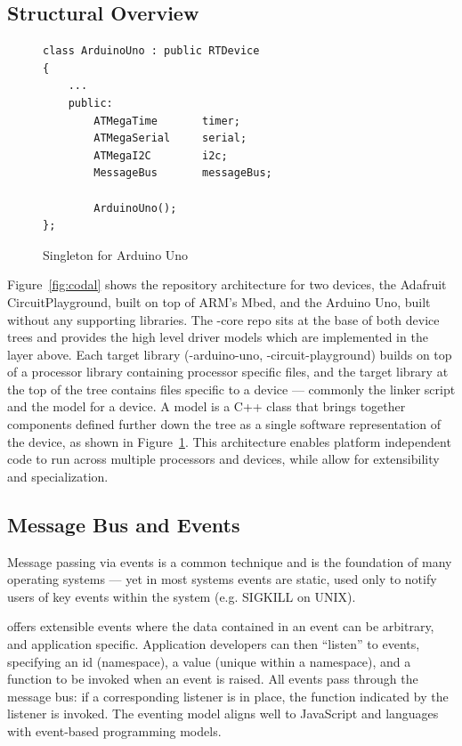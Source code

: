 \subsection{Structural Overview}

\begin{figure}
\begin{lstlisting}
class ArduinoUno : public RTDevice
{
    ...
    public:
        ATMegaTime       timer;
        ATMegaSerial     serial;
        ATMegaI2C        i2c;
        MessageBus       messageBus;

        ArduinoUno();
};
\end{lstlisting}
\caption{\label{fig:codalSingleton}Singleton for Arduino Uno}
\end{figure}

Figure~\ref{fig:codal} shows the repository architecture for two \CO devices, the Adafruit CircuitPlayground, built on top of ARM's Mbed, and the Arduino Uno, built without any supporting libraries. The \COLN-core repo sits at the base of both device trees and provides the high level driver models which are implemented in the layer above. Each target library (\COLN-arduino-uno, \COLN-circuit-playground) builds on top of a processor library containing processor specific files, and the target library at the top of the tree contains files specific to a device --- commonly the linker script and the model for a device. A model is a C++ class that brings together components defined further down the tree as a single software representation of the device,
as shown in Figure~\ref{fig:codalSingleton}.
This architecture enables platform independent code to run across multiple processors and devices, while allow for extensibility and specialization.

\subsection{Message Bus and Events}

Message passing via events is a common technique and is the foundation of many operating systems --- yet in most systems events are static, used only to notify users of key events within the system (e.g. SIGKILL on UNIX).

\CO offers extensible events where the data contained in an event can be arbitrary, and application specific. Application developers can then ``listen'' to events, specifying an id (namespace), a value (unique within a namespace), and a function to be invoked when an event is raised. All events pass through the message bus: if a corresponding listener is in place, the function indicated by the listener is invoked. The eventing model aligns well to JavaScript and languages with event-based programming models.

